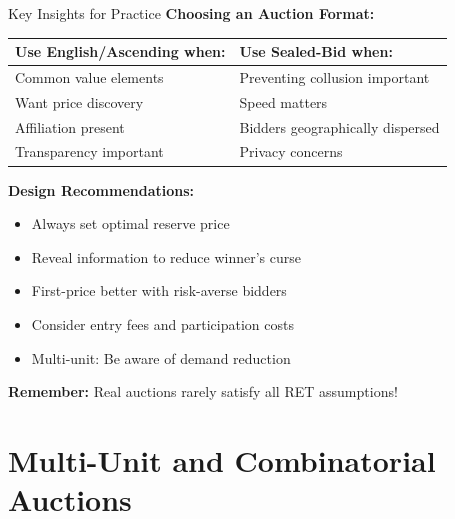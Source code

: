 \documentclass[xcolor={x11names}]{beamer}
\begin{document}
\begin{frame}{Key Insights for Practice}
\textbf{Choosing an Auction Format:}

\begin{tabular}{ll}
\toprule
\textbf{Use English/Ascending when:} & \textbf{Use Sealed-Bid when:} \\
\midrule
Common value elements & Preventing collusion important \\
Want price discovery & Speed matters \\
Affiliation present & Bidders geographically dispersed \\
Transparency important & Privacy concerns \\
\bottomrule
\end{tabular}


\textbf{Design Recommendations:}
\begin{itemize}
  \item Always set optimal reserve price
  \item Reveal information to reduce winner's curse
  \item First-price better with risk-averse bidders
  \item Consider entry fees and participation costs
  \item Multi-unit: Be aware of demand reduction
\end{itemize}

\textbf{Remember:} Real auctions rarely satisfy all RET assumptions!
\end{frame}



\section{Multi-Unit and Combinatorial Auctions}
\end{document}
